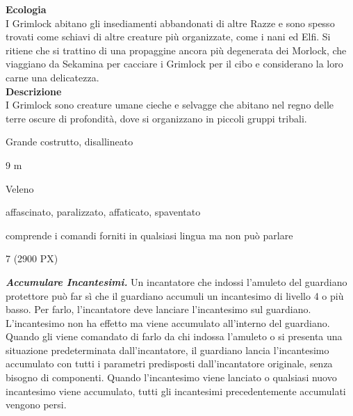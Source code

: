 \begin{multicols}{2}
{\textbf{Ecologia}\\
I Grimlock abitano gli insediamenti abbandonati di altre Razze e sono spesso trovati come schiavi di altre creature più organizzate, come i nani ed Elfi. Si ritiene che si trattino di una propaggine ancora più degenerata dei Morlock, che viaggiano da Sekamina per cacciare i Grimlock per il cibo e considerano la loro carne una delicatezza.\\
\textbf{Descrizione}\\
I Grimlock sono creature umane cieche e selvagge che abitano nel regno delle terre oscure di profondità, dove si organizzano in piccoli gruppi tribali.

\begin{description}[noitemsep, topsep=0pt, parsep=0pt, partopsep=0pt, itemsep=1pt, leftmargin=2.35cm,  labelwidth=2.2cm, itemindent=0cm, listparindent=0pt] %
\setlength{\baselineskip}{10pt}
\item[\textbf{Taglia/Tipo}] Grande costrutto, disallineato
\item[\textbf{Caratt.}] 
\item[\textbf{Punti Ferita}] 
\item[\textbf{Movimento}] 9 m
\item[\textbf{Tiri Salvez.}] 
\item[\textbf{Imm. Danni}] Veleno
\item[\textbf{Immunità}] affascinato, paralizzato, affaticato, spaventato
\item[\textbf{Sensi}] 
\item[\textbf{Linguaggi}] comprende i comandi forniti in qualsiasi lingua ma non può parlare
\item[\textbf{Sfida}] 7 (2900 PX)
\end{description}
\smallskip

\emph{\textbf{Accumulare Incantesimi.}} Un incantatore che indossi l'amuleto del guardiano protettore può far sì che il guardiano accumuli un incantesimo di livello 4 o più basso. Per farlo, l'incantatore deve lanciare l'incantesimo sul guardiano. L'incantesimo non ha effetto ma viene accumulato all'interno del guardiano. Quando gli viene comandato di farlo da chi indossa l'amuleto o si presenta una situazione predeterminata dall'incantatore, il guardiano lancia l'incantesimo accumulato con tutti i parametri predisposti dall'incantatore originale, senza bisogno di componenti. Quando l'incantesimo viene lanciato o qualsiasi nuovo incantesimo viene accumulato, tutti gli incantesimi precedentemente accumulati vengono persi.

}
\end{multicols}
